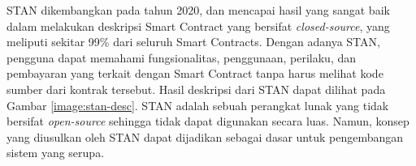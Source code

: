 STAN dikembangkan pada tahun 2020, dan mencapai hasil yang sangat baik dalam melakukan deskripsi Smart Contract yang bersifat \textit{closed-source}, yang meliputi sekitar 99\% dari seluruh Smart Contracts. Dengan adanya STAN, pengguna dapat memahami fungsionalitas, penggunaan, perilaku, dan pembayaran yang terkait dengan Smart Contract tanpa harus melihat kode sumber dari kontrak tersebut. Hasil deskripsi dari STAN dapat dilihat pada Gambar \ref{image:stan-desc}. STAN adalah sebuah perangkat lunak yang tidak bersifat \textit{open-source} sehingga tidak dapat digunakan secara luas. Namun, konsep yang diusulkan oleh STAN dapat dijadikan sebagai dasar untuk pengembangan sistem yang serupa.
